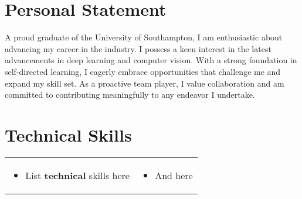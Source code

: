 \documentclass[letterpaper]{twentysecondcv} %
\begin{document}

\section*{Personal Statement}


A proud graduate of the University of Southampton, I am enthusiastic about advancing my career in the industry. I possess a keen interest in the latest advancements in deep learning and computer vision. With a strong foundation in self-directed learning, I eagerly embrace opportunities that challenge me and expand my skill set. As a proactive team player, I value collaboration and am committed to contributing meaningfully to any endeavor I undertake.
















\section*{Technical Skills}

\cvtags



\begin{tabularx}{\linewidth}{XX}
	\begin{itemize}
		\item List \textbf{technical} skills here
	\end{itemize} & 
	\begin{itemize}
		\item And here
	\end{itemize} \\
\end{tabularx}
\end{document}
